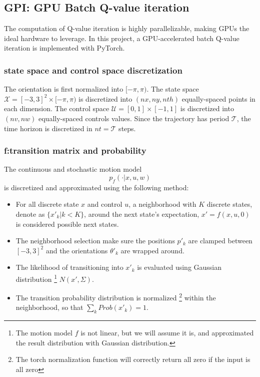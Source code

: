 \documentclass[conference]{IEEEtran}
\begin{document}
\subsection{GPI: GPU Batch Q-value iteration}
The computation of Q-value iteration is highly parallelizable, 
making GPUs the ideal hardware to leverage. 
In this project, 
a GPU-accelerated batch Q-value iteration is implemented with PyTorch.

\subsubsection{state space and control space discretization}
The orientation is first normalized into $[-\pi,\pi)$.
The state space $\mathcal{X} = [-3,3]^2\times[-\pi,\pi)$ is
discretized into $(nx, ny, nth)$ equally-spaced points in each dimension.
The control space $\mathcal{U} = [0,1]\times[-1,1]$ is discretized into $(nv,nw)$
equally-spaced controls values.
Since the trajectory has period $\mathcal{T}$, 
the time horizon is discretized in $nt=\mathcal{T}$ steps.

\subsubsection{f:transition matrix and probability}
The continuous and stochastic motion model
\[p_f(\cdot | x, u, w) \]
is discretized and approximated using the following method:

\begin{itemize}
    \item For all discrete state \( x \) and control \( u \),
    a neighborhood with $K$ discrete states, denote as \( \{x'_{k} |k < K\}\), 
    around the next state's expectation, \(x' = f(x, u, 0) \)
    is considered possible next states.
    \item The neighborhood selection make sure the positions $p'_k$ are clamped between $[-3,3]^2$
    and the orientations $\theta'_k$ are wrapped around. 
    \item  The likelihood of transitioning into \( x'_k \)
    is evaluated using Gaussian distribution
    \footnote{The motion model $f$ is not linear, but we will assume it is, and approximated 
    the result distribution with Gaussian distribution.}
    \( N(x', \Sigma) \).
    \item The transition probability distribution is normalized 
    \footnote{The torch normalization function will correctly return all zero if the input is all zero}
    within the neighborhood, so that \(\sum_k Prob(x'_{k}) = 1\).
\end{itemize}
\end{document}
